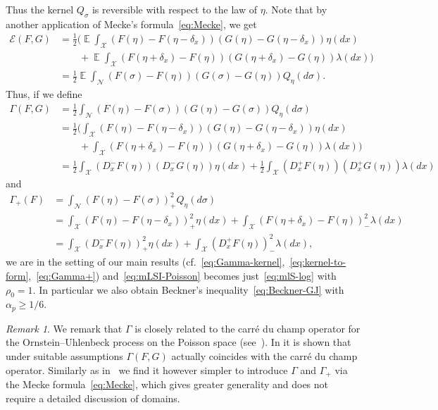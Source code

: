 \documentclass[a4paper]{amsart}
\theoremstyle{definition}
\theoremstyle{remark}
\newtheorem{remark}[theorem]{Remark}
\numberwithin{equation}{section}
\DeclareMathOperator{\EE}{\mathbb{E}} %
\newcommand*{\calE}{\mathcal{E}}
\begin{document}
Thus the kernel $Q_\sigma$ is reversible with respect to the law of $\eta$.
Note that by another application of Mecke's formula~\eqref{eq:Mecke}, we get
\begin{align*}
  \calE(F,G)  &= \frac{1}{2}\Big(\EE \int_\mathcal{X} (F(\eta) - F(\eta - \delta_x))(G(\eta) - G(\eta - \delta_x))\eta(dx) \\
  &\qquad + \EE \int_\mathcal{X} (F(\eta+\delta_x) - F(\eta))(G(\eta+\delta_x) - G(\eta))\lambda(dx)\Big)\\
   &= \frac{1}{2}\EE \int_\mathcal{N}(F(\sigma) - F(\eta))(G(\sigma) - G(\eta))Q_\eta(d\sigma).
\end{align*}
Thus, if we define
\begin{align*}
  \Gamma(F,G) &=
  \frac{1}{2}\int_\mathcal{N} (F(\eta) - F(\sigma))(G(\eta)-G(\sigma))Q_\eta(d\sigma)\\
  &= \frac{1}{2}\Big(\int_\mathcal{X} (F(\eta) - F(\eta - \delta_x))(G(\eta) - G(\eta - \delta_x))\eta(dx)\\
  &\qquad + \int_\mathcal{X} (F(\eta+\delta_x) - F(\eta))(G(\eta+\delta_x) - G(\eta))\lambda(dx)\Big)\\
  &= \frac{1}{2}\int_\mathcal{X} (D_x^- F(\eta))(D_x^- G(\eta))\eta(dx) + \frac{1}{2}\int_\mathcal{X} (D_x^+ F(\eta))(D_x^+ G(\eta))\lambda(dx)
\end{align*}
and
\begin{align}\label{eq:Poisson-gamma-plus}
  \Gamma_+(F) &=  \int_\mathcal{N} (F(\eta) - F(\sigma))_+^2Q_\eta(d\sigma)\\
  &=\int_\mathcal{X} (F(\eta) - F(\eta - \delta_x))_+^2\eta(dx) + \int_\mathcal{X} (F(\eta+\delta_x) - F(\eta))_-^2\lambda(dx)\nonumber\\
  &= \int_\mathcal{X} (D_x^- F(\eta))_+^2\eta(dx) + \int_\mathcal{X} (D_x^+ F(\eta))_-^2\lambda(dx),\nonumber
\end{align}
we are in the setting of our main results (cf.~\eqref{eq:Gamma-kernel},~\eqref{eq:kernel-to-form},~\eqref{eq:Gamma+}) and~\eqref{eq:mLSI-Poisson} becomes just~\eqref{eq:mlS-log} with $\rho_0 = 1$. In particular we also obtain Beckner's inequality~\eqref{eq:Beckner-GJ} with $\alpha_p \ge 1/6$.

\begin{remark}
We remark that $\Gamma$ is closely related to the carr\'e du champ operator for the Ornstein--Uhlenbeck process on the Poisson space (see~\cite{MR3585396}). In \cite[Proposition 2.6]{MR3896829}
it is shown that under suitable assumptions $\Gamma(F,G)$ actually coincides with the carr\'e du champ operator. Similarly as in~\cite{MR3485348} we find it however simpler to introduce $\Gamma$ and $\Gamma_+$ via the Mecke formula~\eqref{eq:Mecke}, which gives greater generality and does not require a detailed discussion of domains.
\end{remark}
\end{document}
